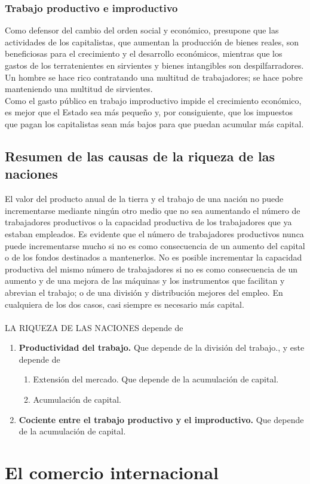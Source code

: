 \documentclass[10pt]{book}
\begin{document}
\subsubsection*{Trabajo productivo e improductivo}
Como defensor del cambio del orden social y económico, presupone que las actividades de los capitalistas, que aumentan la producción de bienes reales, son beneficiosas para el crecimiento y el desarrollo económicos, mientras que los gastos de los terratenientes en sirvientes y bienes intangibles son despilfarradores. Un hombre se hace rico contratando una multitud de trabajadores; se hace pobre manteniendo una multitud de sirvientes.\\
Como el gasto público en trabajo improductivo impide el crecimiento económico, es mejor que el Estado sea más pequeño y, por consiguiente, que los impuestos que pagan los capitalistas sean más bajos para que puedan acumular más capital.

\subsection*{Resumen de las causas de la riqueza de las naciones}
El valor del producto anual de la tierra y el trabajo de una nación no puede incrementarse mediante ningún otro medio que no sea aumentando el número de trabajadores productivos o la capacidad productiva de los trabajadores que ya estaban empleados. Es evidente que el número de trabajadores productivos nunca puede incrementarse mucho si no es como consecuencia de un aumento del capital o de los fondos destinados a mantenerlos. No es posible incrementar la capacidad productiva del mismo número de trabajadores si no es como consecuencia de un aumento y de una mejora de las máquinas y los instrumentos que facilitan y abrevian el trabajo; o de una división y distribución mejores del empleo. En cualquiera de los dos casos, casi siempre es necesario más capital.\\\\

LA RIQUEZA DE LAS NACIONES depende de

\begin{enumerate}[\bfseries 1.]
    \item \textbf{Productividad del trabajo.} Que depende de la división del trabajo., y este depende de 
	\begin{enumerate}[\bfseries a.]
	    \item Extensión del mercado. Que depende de la acumulación de capital.
	    \item Acumulación de capital.
	\end{enumerate}
    \item \textbf{Cociente entre el trabajo productivo y el improductivo.} Que depende de la acumulación de capital.
\end{enumerate}

\section*{El comercio internacional}
\end{document}
